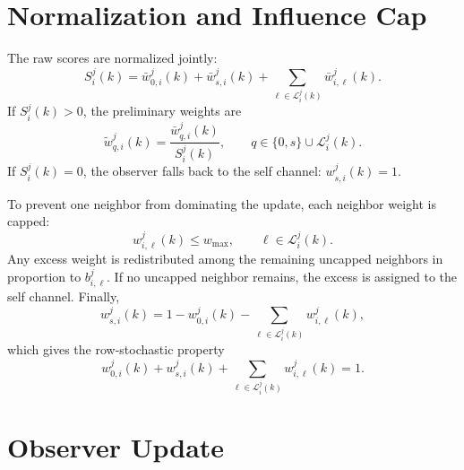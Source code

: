 \documentclass[11pt]{article}
\newcommand{\Lset}{\mathcal{L}}
\begin{document}
\section{Normalization and Influence Cap}

The raw scores are normalized jointly:
\begin{equation}
    S_i^j(k)
    =
    \bar{w}_{0,i}^{j}(k)
    +
    \bar{w}_{s,i}^{j}(k)
    +
    \sum_{\ell\in\Lset_i^j(k)} \bar{w}_{i,\ell}^{j}(k).
\end{equation}
If \(S_i^j(k)>0\), the preliminary weights are
\begin{equation}
    \tilde{w}_{q,i}^{j}(k)
    =
    \frac{\bar{w}_{q,i}^{j}(k)}{S_i^j(k)},
    \qquad
    q\in\{0,s\}\cup\Lset_i^j(k).
    \label{eq:prelim_weights}
\end{equation}
If \(S_i^j(k)=0\), the observer falls back to the self channel:
\(w_{s,i}^{j}(k)=1\).

To prevent one neighbor from dominating the update, each neighbor weight is
capped:
\begin{equation}
    w_{i,\ell}^{j}(k) \leq w_{\max},
    \qquad \ell\in\Lset_i^j(k).
    \label{eq:cap_constraint}
\end{equation}
Any excess weight is redistributed among the remaining uncapped neighbors in
proportion to \(b_{i,\ell}^{j}\). If no uncapped neighbor remains, the excess is
assigned to the self channel. Finally,
\begin{equation}
    w_{s,i}^{j}(k)
    =
    1
    -
    w_{0,i}^{j}(k)
    -
    \sum_{\ell\in\Lset_i^j(k)} w_{i,\ell}^{j}(k),
    \label{eq:self_residual}
\end{equation}
which gives the row-stochastic property
\begin{equation}
    w_{0,i}^{j}(k)
    +
    w_{s,i}^{j}(k)
    +
    \sum_{\ell\in\Lset_i^j(k)} w_{i,\ell}^{j}(k)
    =
    1.
    \label{eq:row_stochastic}
\end{equation}

\section{Observer Update}
\end{document}
